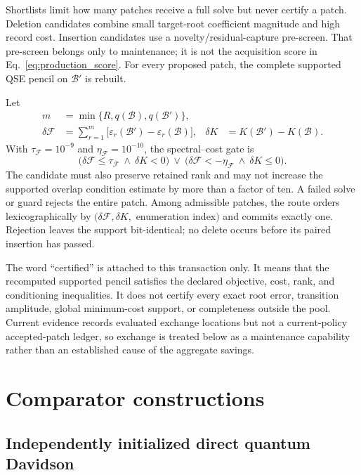\documentclass[
  reprint,
  amsmath,
  amssymb,
  aps,
  pra,
  nofootinbib,
  superscriptaddress,
  floatfix
]{revtex4-2}
\begin{document}
Shortlists limit how many patches receive a full solve but never certify a
patch.  Deletion candidates combine small target-root coefficient magnitude
and high record cost.  Insertion candidates use a novelty/residual-capture
pre-screen.  That pre-screen belongs only to maintenance; it is not the
acquisition score in Eq.~\eqref{eq:production_score}.  For every proposed
patch, the complete supported QSE pencil on $\mathcal B'$ is rebuilt.

Let
\begin{align}
 m&=\min\{R,q(\mathcal B),q(\mathcal B')\},\\
 \delta\mathcal F&=\sum_{r=1}^{m}
 \bigl[\varepsilon_r(\mathcal B')-\varepsilon_r(\mathcal B)\bigr],
 &\delta K&=K(\mathcal B')-K(\mathcal B).
 \label{eq:exchange_deltas}
\end{align}
With $\tau_{\mathcal F}=10^{-9}$ and
$\eta_{\mathcal F}=10^{-10}$, the spectral--cost gate is
\begin{equation}
 \bigl(\delta\mathcal F\leq\tau_{\mathcal F}\ \wedge\ \delta K<0\bigr)
 \ \vee\
 \bigl(\delta\mathcal F<-\eta_{\mathcal F}\ \wedge\ \delta K\leq0\bigr).
 \label{eq:exchange_dominance}
\end{equation}
The candidate must also preserve retained rank and may not increase the
supported overlap condition estimate by more than a factor of ten.  A failed
solve or guard rejects the entire patch.  Among admissible patches, the route
orders lexicographically by $(\delta\mathcal F,\delta K,$ enumeration index$)$
and commits exactly one.  Rejection leaves the support bit-identical; no
delete occurs before its paired insertion has passed.

The word ``certified'' is attached to this transaction only.  It means that
the recomputed supported pencil satisfies the declared objective, cost, rank,
and conditioning inequalities.  It does not certify every exact root error,
transition amplitude, global minimum-cost support, or completeness outside
the pool.  Current evidence records evaluated exchange locations but not a
current-policy accepted-patch ledger, so exchange is treated below as a
maintenance capability rather than an established cause of the aggregate
savings.

\section{Comparator constructions}
\label{sec:comparators}

\subsection{Independently initialized direct quantum Davidson}
\label{sec:direct_davidson}
\end{document}
